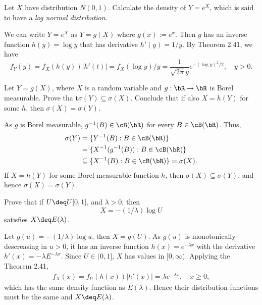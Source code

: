 \begin{exercise}
  Let $X$ have distribution $N(0,1)$. Calculate the density of $Y=e^X$, which is said to have a \textit{log normal distribution}.
\end{exercise}
\begin{solution}
  We can write $Y=e^X$ as $Y=g(X)$ where $g(x):=e^x$. Then $g$ has an inverse function $h(y)=\log y$ that has derivative $h'(y)=1/y$. By Theorem 2.41, we have
  \[
    f_Y(y)=f_X(h(y))|h'(t)| = f_X(\log y)/y = \frac{1}{\sqrt{2\pi}y}e^{-(\log y)^2/2}, \quad y>0.
  \]
\end{solution}


\begin{exercise}
  Let $Y=g(X)$, where $X$ is a random variable and $g:\bR\to\bR$ is Borel measurable. Prove tha t$\sigma(Y)\subseteq\sigma(X)$. Conclude that if also $X=h(Y)$ for some $h$, then $\sigma(X) =\sigma(Y)$.
\end{exercise}
\begin{solution}
  As $g$ is Borel measurable, $g^{-1}(B)\in\cB(\bR)$ for every $B\in\cB(\bR)$. Thus,
  \begin{align*}
    \sigma(Y) &= \{Y^{-1}(B):B\in\cB(\bR)\} \\
      &= \{X^{-1}(g^{-1}(B)):B\in\cB(\bR)\} \\
      &\subseteq \{X^{-1}(B):B\in\cB(\bR)\} = \sigma(X).
  \end{align*}
  If $X=h(Y)$ for some Borel measurable function $h$, then $\sigma(X)\subseteq \sigma(Y)$, and hence $\sigma(X)=\sigma(Y)$.
\end{solution}


\begin{exercise}
  Prove that if $U\deq U[0, 1]$, and $\lambda>0$, then
  \[ X = -(1/\lambda)\log U \]
  satisfies $X\deq E(\lambda)$.
\end{exercise}
\begin{solution}
  Let $g(u)=-(1/\lambda)\log u$, then $X=g(U)$. As $g(u)$ is monotonically descreasing in $u>0$, it has an inverse function $h(x)=e^{-\lambda x}$ with the derivative $h'(x)=-\lambda E^{-\lambda x}$. Since $U\in(0, 1]$, $X$ has values in $[0, \infty)$. Applying the Theorem 2.41,
  \begin{align*}
    f_X(x) = f_U(h(x))|h'(x)| = \lambda e^{-\lambda x}, \quad x\geq 0,
  \end{align*}
  which has the same density function as $E(\lambda)$. Hence their distribution functions must be the same and $X\deq E(\lambda)$.
\end{solution}


